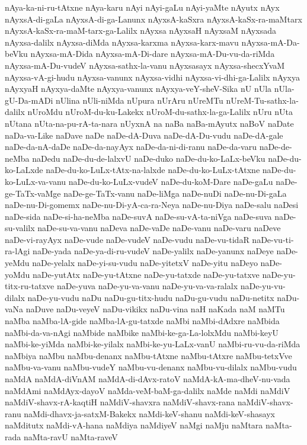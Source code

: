 {nAya-ka-ni-ru-tAtxne
nAya-karu
nAyi
nAyi-gaLu
nAyi-yaMte
nAyutx
nAyx
nAyxsA-di-gaLa
nAyxsA-di-ga-Lanunx
nAyxsA-kaSxra
nAyxsA-kaSx-ra-maMtarx
nAyxsA-kaSx-ra-maM-tarx-ga-Lalilx
nAyxsa
nAyxsaH
nAyxsaM
nAyxsada
nAyxsa-dalilx
nAyxsa-diMda
nAyxsa-karxma
nAyxsa-karx-mavu
nAyxsa-mA-Da-beVku
nAyxsa-mA-Dida
nAyxsa-mA-Di-dare
nAyxsa-mA-Du-vu-da-riMda
nAyxsa-mA-Du-vudeV
nAyxsa-sathx-la-vanu
nAyxsasayx
nAyxsa-shecxYvaM
nAyxsa-vA-gi-hudu
nAyxsa-vanunx
nAyxsa-vidhi
nAyxsa-vi-dhi-ga-Lalilx
nAyxya
nAyxyaH
nAyxya-daMte
nAyxya-vanunx
nAyxya-veY-sheV-Sika
nU
nUla
nUla-gU-Da-mADi
nUlina
nUli-niMda
nUpura
nUrAru
nUreMTu
nUreM-Tu-sathx-la-dalilx
nUroMdu
nUroM-du-ku-Lakekx
nUroM-du-sathx-la-ga-Lalilx
nUru
nUta
nUtana
nUta-na-pu-rA-ta-nara
nUyxnA
na
naBa
naBa-mAyutx
naBoV
naDate
naDa-va-Like
naDave
naDe
naDe-dA-Duva
naDe-dA-Du-vudu
naDe-dA-gale
naDe-da-nA-daDe
naDe-da-nayAyx
naDe-da-ni-di-ranu
naDe-da-varu
naDe-de-neMba
naDedu
naDe-du-de-lalxvU
naDe-duko
naDe-du-ko-LaLx-beVku
naDe-du-ko-LaLxde
naDe-du-ko-LuLx-tAtx-na-lalxde
naDe-du-ko-LuLx-tAtxne
naDe-du-ko-LuLx-va-vanu
naDe-du-ko-LuLx-vudeV
naDe-du-koM-Dare
naDe-gaLu
naDe-ge-TaTx-vaMge
naDe-ge-TaTx-vanu
naDe-liMga
naDe-nuDi
naDe-nu-Di-gaLa
naDe-nu-Di-gomemx
naDe-nu-Di-yA-ca-ra-Neya
naDe-nu-Diya
naDe-salu
naDesi
naDe-sida
naDe-si-ha-neMba
naDe-suvA
naDe-su-vA-ta-niVga
naDe-suva
naDe-su-valilx
naDe-su-va-vanu
naDeva
naDe-vaDe
naDe-vanu
naDe-varu
naDeve
naDe-vi-rayAyx
naDe-vude
naDe-vudeV
naDe-vudu
naDe-vu-tidaR
naDe-vu-ti-ra-lAgi
naDe-yada
naDe-ya-di-ru-vudeV
naDe-yalilx
naDe-yanunx
naDeye
naDe-yeMdu
naDe-yelalx
naDe-yi-su-vudu
naDe-yitetxV
naDe-yitu
naDeyo
naDe-yoMdu
naDe-yutAtx
naDe-yu-tAtxne
naDe-yu-tatxde
naDe-yu-tatxve
naDe-yu-titx-ru-tatxve
naDe-yuva
naDe-yu-va-vanu
naDe-yu-va-va-ralalx
naDe-yu-vu-dilalx
naDe-yu-vudu
naDu
naDu-gu-titx-hudu
naDu-gu-vudu
naDu-netitx
naDu-vaNa
naDuve
naDu-veyeV
naDu-vikikx
naDu-vina
naH
naKada
naM
naMTu
naMba
naMba-lA-gide
naMba-lA-gu-tatxde
naMbi
naMbi-dAdxre
naMbida
naMbi-da-va-nAgi
naMbide
naMbike
naMbi-ke-ga-La-lolxMdu
naMbi-keyU
naMbi-ke-yiMda
naMbi-ke-yilalx
naMbi-ke-yu-LaLx-vanU
naMbi-ru-vu-da-riMda
naMbiya
naMbu
naMbu-denanx
naMbu-tAtxne
naMbu-tAtxre
naMbu-tetxVve
naMbu-va-vanu
naMbu-vudeY
naMbu-vu-denanx
naMbu-vu-dilalx
naMbu-vudu
naMdA
naMdA-diVnAM
naMdA-di-dAvx-ratoV
naMdA-kA-ma-dheV-nu-vada
naMdAmi
naMdAyx-dayoV
naMda-veM-baM-ga-dalilx
naMde
naMdi
naMdiV
naMdiV-shavx-rA-kaqtiH
naMdiV-shavxra
naMdiV-shavx-rana
naMdiV-shavx-ranu
naMdi-dhavx-ja-satxM-Bakekx
naMdi-keV-shanu
naMdi-keV-shasayx
naMditutx
naMdi-vA-hana
naMdiya
naMdiyeV
naMgi
naMju
naMtara
naMta-rada
naMta-ravU
naMta-raveV
}
